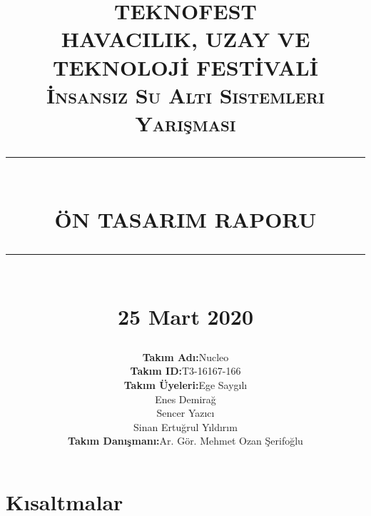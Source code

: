 \documentclass[12pt]{article}
\newcommand{\HRule}[1]{\rule{\linewidth}{#1}}
\begin{document}
\title{\vspace{1cm}
\textsc{\LARGE TEKNOFEST}\\[0.5cm]
\textsc{\large HAVACILIK, UZAY VE TEKNOLOJİ FESTİVALİ}\\[0.5cm]
\textsc{\large İnsansız Su Altı Sistemleri Yarışması}\\[0.5cm]

\HRule{0.5pt} \\[0.4cm]
{\LARGE \bfseries ÖN TASARIM RAPORU}\\[0.3cm]
\HRule{0.5pt} \\[0.5cm]
{\large 25 Mart 2020}\\
\date{}
\author{


\begin{tabular}{l|l}
\textbf{Takım Adı:}       &   Nucleo\\
\textbf{Takım ID:}        &   T3-16167-166\\
\textbf{Takım Üyeleri:}   &   Ege Saygılı\\
                          &   Enes Demirağ\\
                          &   Sencer Yazıcı\\ 
                          &   Sinan Ertuğrul Yıldırım\\
\textbf{Takım Danışmanı:} &   Ar. Gör. Mehmet Ozan Şerifoğlu 
\end{tabular}
}
}
\maketitle
\newpage

\tableofcontents

\newpage
{}

\section*{Kısaltmalar}

\newpage
{}
\listoffigures
\listoftables
\newpage
\end{document}
